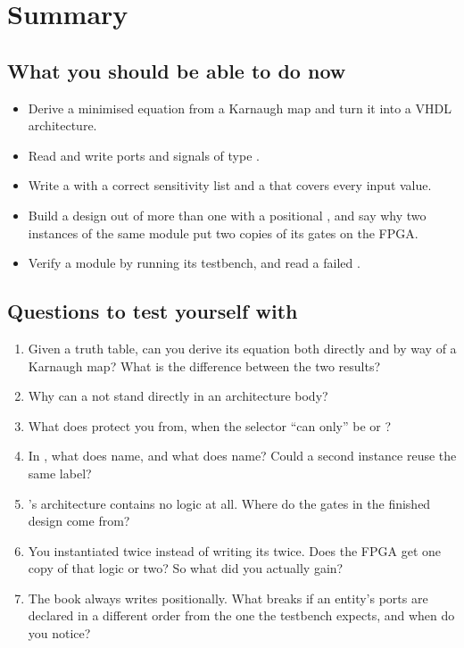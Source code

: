 
\section{Summary}
\label{c2:sec:review}

\subsection*{What you should be able to do now}
\begin{itemize}
  \item Derive a minimised equation from a Karnaugh map and turn it into a VHDL architecture.
  \item Read and write ports and signals of type .
  \item Write a  with a correct sensitivity list and a  that covers every
    input value.
  \item Build a design out of more than one  with a positional , and
    say why two instances of the same module put two copies of its gates on the FPGA.
  \item Verify a module by running its testbench, and read a failed .
\end{itemize}

\subsection*{Questions to test yourself with}
\begin{enumerate}
  \item Given a truth table, can you derive its equation both directly and by way of a Karnaugh
    map? What is the difference between the two results?
  \item Why can a  not stand directly in an architecture body?
  \item What does  protect you from, when the selector ``can only'' be 
    or ?
  \item In , what does  name, and what does
     name? Could a second instance reuse the same label?
  \item {}'s architecture contains no logic at all. Where do the gates in the
    finished design come from?
  \item You instantiated  twice instead of writing its  twice. Does the
    FPGA get one copy of that logic or two? So what did you actually gain?
  \item The book always writes  positionally. What breaks if an entity's ports are
    declared in a different order from the one the testbench expects, and when do you notice?
\end{enumerate}

